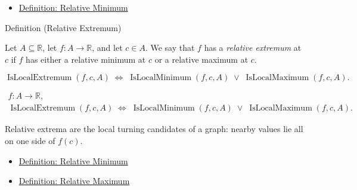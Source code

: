 \begin{dependencies}
\begin{itemize}
  \item \hyperref[def:relative-minimum]{Definition: Relative Minimum}
\end{itemize}
\end{dependencies}


\begin{definitionbox}{Definition (Relative Extremum)}
\begin{definition}
\label{def:relative-extremum}
Let $A \subseteq \mathbb{R}$, let $f : A \to \mathbb{R}$, and let $c \in A$. We say that $f$ has a \emph{relative extremum} at $c$ if $f$ has either a relative minimum at $c$ or a relative maximum at $c$.
\end{definition}
\end{definitionbox}

\begin{remark*}
\[
\operatorname{IsLocalExtremum}(f,c,A)
\;\Longleftrightarrow\;
\operatorname{IsLocalMinimum}(f,c,A) \;\lor\; \operatorname{IsLocalMaximum}(f,c,A).
\]
\end{remark*}

\begin{remark*}
\[
\begin{aligned}
  f\colon A\to\mathbb{R},\\
\operatorname{IsLocalExtremum}(f,c,A)
\;\Longleftrightarrow\;
\operatorname{IsLocalMinimum}(f,c,A) \;\lor\; \operatorname{IsLocalMaximum}(f,c,A).
\end{aligned}
\]
\end{remark*}

\begin{remark*}[Interpretation]
Relative extrema are the local turning candidates of a graph: nearby values lie all on one side of $f(c)$.
\end{remark*}

\begin{dependencies}
\begin{itemize}
  \item \hyperref[def:relative-minimum]{Definition: Relative Minimum}
  \item \hyperref[def:relative-maximum]{Definition: Relative Maximum}
\end{itemize}
\end{dependencies}

